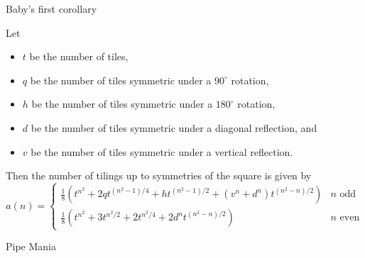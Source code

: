 \documentclass{beamer}%
\begin{document}
\begin{frame}{Baby's first corollary}
  \begin{theorem}
    Let \begin{itemize}
      \item $t$ be the number of tiles,
      \item $q$ be the number of tiles symmetric under a $90^\circ$ rotation,
      \item $h$ be the number of tiles symmetric under a $180^\circ$ rotation,
      \item $d$ be the number of tiles symmetric under a diagonal reflection, and
      \item $v$ be the number of tiles symmetric under a vertical reflection.
    \end{itemize}
    Then the number of tilings up to symmetries of the square is given by
  \[
    a(n) = \begin{cases}
      \frac 18 (
        t^{n^2} + 2qt^{(n^2-1)/4} + ht^{(n^2-1)/2} + (v^n + d^n)t^{(n^2-n)/2}
      ) & n \text{ odd} \\
      \frac 18 (
        t^{n^2} + 3t^{n^2/2} + 2t^{n^2/4} + 2d^n t^{(n^2-n)/2}
      ) & n \text{ even}
    \end{cases}
  \]
  \end{theorem}
\end{frame}

\begin{frame}{Pipe Mania}
\end{frame}
\end{document}
